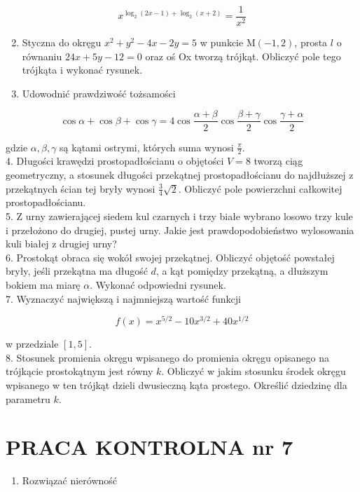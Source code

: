 \documentclass[10pt]{article}
\begin{document}
$$
x^{\log _{2}(2 x-1)+\log _{2}(x+2)}=\frac{1}{x^{2}}
$$

\begin{enumerate}
  \setcounter{enumi}{1}
  \item Styczna do okręgu $x^{2}+y^{2}-4 x-2 y=5$ w punkcie $\mathrm{M}(-1,2)$, prosta $l$ o równaniu $24 x+5 y-12=0$ oraz oś Ox tworzą trójkąt. Obliczyć pole tego trójkąta i wykonać rysunek.
  \item Udowodnić prawdziwość tożsamości
\end{enumerate}

$$
\cos \alpha+\cos \beta+\cos \gamma=4 \cos \frac{\alpha+\beta}{2} \cos \frac{\beta+\gamma}{2} \cos \frac{\gamma+\alpha}{2}
$$

gdzie $\alpha, \beta, \gamma$ są kątami ostrymi, których suma wynosi $\frac{\pi}{2}$.\\
4. Długości krawędzi prostopadłościanu o objętości $V=8$ tworzą ciąg geometryczny, a stosunek długości przekątnej prostopadłościanu do najdłuższej z przekątnych ścian tej bryły wynosi $\frac{3}{4} \sqrt{2}$. Obliczyć pole powierzchni całkowitej prostopadłościanu.\\
5. Z urny zawierającej siedem kul czarnych i trzy białe wybrano losowo trzy kule i przełożono do drugiej, pustej urny. Jakie jest prawdopodobieństwo wylosowania kuli białej z drugiej urny?\\
6. Prostokąt obraca się wokół swojej przekątnej. Obliczyć objętość powstałej bryły, jeśli przekątna ma długość $d$, a kąt pomiędzy przekątną, a dłuższym bokiem ma miarę $\alpha$. Wykonać odpowiedni rysunek.\\
7. Wyznaczyć największą i najmniejszą wartość funkcji

$$
f(x)=x^{5 / 2}-10 x^{3 / 2}+40 x^{1 / 2}
$$

w przedziale $[1,5]$.\\
8. Stosunek promienia okręgu wpisanego do promienia okręgu opisanego na trójkącie prostokątnym jest równy $k$. Obliczyć w jakim stosunku środek okręgu wpisanego w ten trójkąt dzieli dwusieczną kąta prostego. Określić dziedzinę dla parametru $k$.

\section*{PRACA KONTROLNA nr 7}
\begin{enumerate}
  \item Rozwiązać nierówność
\end{enumerate}
\end{document}
